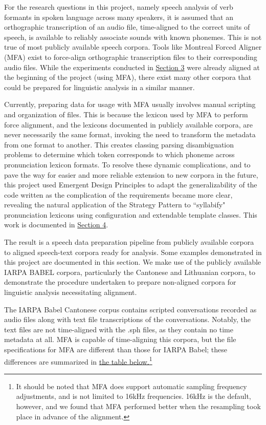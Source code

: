 \documentclass[11pt]{article}
\begin{document}
For the research questions in this project, namely speech analysis of verb formants in spoken language across many speakers, it is assumed that an orthographic transcription of an audio file, time-aligned to the correct units of speech, is available to reliably associate sounds with known phonemes. This is not true of most publicly available speech corpora. Tools like Montreal Forced Aligner (MFA)\cite{mcauliffe_montreal_nodate} exist to force-align orthographic transcription files to their corresponding audio files. While the experiments conducted in \hyperlink{section.3}{Section 3} were already aligned at the beginning of the project (using MFA), there exist many other corpora that could be prepared for linguistic analysis in a similar manner. 

Currently, preparing data for usage with MFA usually involves manual scripting and organization of files. This is because the lexicon used by MFA to perform force alignment, and the lexicons documented in publicly available corpora, are never necessarily the same format, invoking the need to transform the metadata from one format to another. This creates classing parsing disambiguation problems to determine which token corresponds to which phoneme across pronunciation lexicon formats. To resolve these dynamic complications, and to pave the way for easier and more reliable extension to new corpora in the future, this project used Emergent Design Principles\cite{bain_emergent_2008} to adapt the generalizability of the code written as the complication of the requirements became more clear, revealing the natural application of the Strategy Pattern\cite{freeman_head_2004} to ``syllabify" pronunciation lexicons using configuration and extendable template classes. This work is documented in \hyperlink{section.4}{Section 4}.

The result is a speech data preparation pipeline from publicly available corpora to aligned speech-text corpora ready for analysis. Some examples demonstrated in this project are documented in this section. We make use of the publicly available IARPA BABEL corpora, particularly the Cantonese\cite{andrus_iarpa_2016} and Lithuanian\cite{benowitz_iarpa_2019} corpora, to demonstrate the procedure undertaken to prepare non-aligned corpora for linguistic analysis necessitating alignment.

The IARPA Babel Cantonese corpus contains scripted conversations recorded as audio files along with text file transcriptions of the conversations. Notably, the text files are not time-aligned with the .sph files, as they contain no time metadata at all. MFA is capable of time-aligning this corpora, but the file specifications for MFA are different than those for IARPA Babel; these differences are summarized in \hyperlink{table:corpus_format}{the table below.}\footnote{It should be noted that MFA does support automatic sampling frequency adjustments, and is not limited to 16kHz frequencies. 16kHz is the default, however, and we found that MFA performed better when the resampling took place in advance of the alignment.} 
\end{document}
